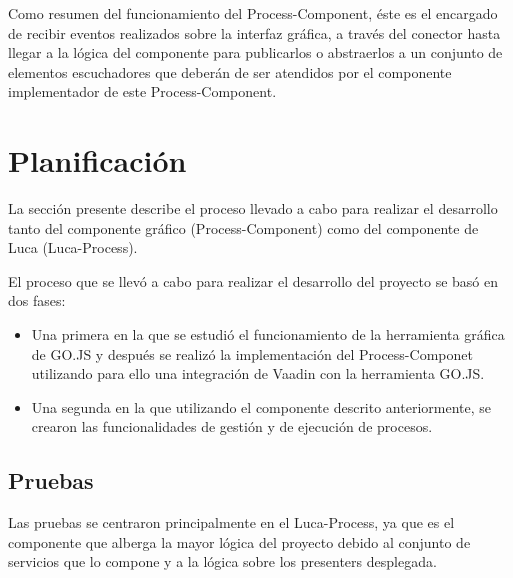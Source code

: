 Como resumen del funcionamiento del Process-Component, éste es el encargado de recibir eventos realizados sobre la interfaz gráfica, a través del conector hasta llegar a la lógica del componente para publicarlos o abstraerlos a un conjunto de elementos escuchadores que deberán de ser atendidos por el componente implementador de este Process-Component.


\section{Planificación}

La sección presente describe el proceso llevado a cabo para realizar el desarrollo tanto del componente gráfico (Process-Component) como del componente de Luca (Luca-Process).

El proceso que se llevó a cabo para realizar el desarrollo del proyecto se basó en dos fases:
	
\begin{itemize}
	\item  Una primera en la que se estudió el funcionamiento de la herramienta gráfica de GO.JS y después se realizó la implementación del Process-Componet utilizando para ello una integración de Vaadin con la herramienta GO.JS.
	\item  Una segunda en la que utilizando el componente descrito anteriormente, se crearon las funcionalidades de gestión y de ejecución de procesos.
\end{itemize}


	
\subsection{Pruebas}
	
	
	Las pruebas se centraron principalmente en el Luca-Process, ya que es el componente que alberga la mayor lógica del proyecto debido al conjunto de servicios que lo compone y a la lógica sobre los presenters desplegada.
	

